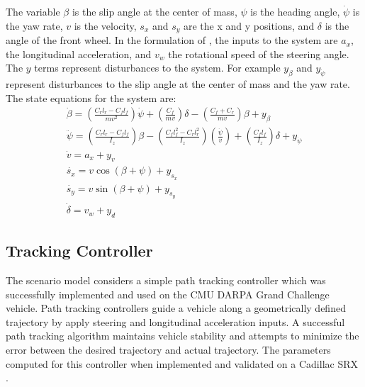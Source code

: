 The variable \(\beta\) is the slip angle at the center of mass, \(\psi\) is the heading angle, \(\dot{\psi}\) is the yaw rate, \(v\) is the velocity, \(s_x\) and \(s_y\) are the x and y positions, and \(\delta\) is the angle of the front wheel. 
In the formulation of \cite{Althoff2014}, the inputs to the system are \(a_x\), the longitudinal acceleration, and \(v_w\) the rotational speed of the steering angle. The \(y\) terms represent disturbances to the system. 
For example \(y_{\beta}\) and \(y_{\dot{\psi}}\) represent disturbances to the slip angle at the center of mass and the yaw rate. The state equations for the system are:
\begin{gather*}
\label{eqn:beta}
\dot{\beta}=\left(\frac{C_rl_r-C_fl_f}{mv^2} \right)\dot{\psi}+\left(\frac{C_f}{mv} \right)\delta-\left(\frac{C_f+C_r}{mv} \right)\beta+y_{\beta}
\\
\label{eqn:psi}
\ddot{\psi}=\left(\frac{C_rl_r-C_fl_f}{I_z} \right)\beta-\left(\frac{C_fl_f^2-C_rl_r^2}{I_z} \right)\left(\frac{\dot{\psi}}{v} \right)+\left(\frac{C_fl_f}{I_z} \right)\delta+y_{\dot{\psi}}
\\
\label{eqn:v}
\dot{v}=a_x+y_v
\\
\label{eqn:sx}
\dot{s_x}=v\cos{(\beta+\psi)}+y_{s_x}
\\
\label{eqn:sy}
\dot{s_y}=v\sin{(\beta+\psi)}+y_{s_y}
\\
\label{eqn:delta}
\dot{\delta}=v_w+y_d
\end{gather*}


\subsection{Tracking Controller}
The scenario model considers a simple path tracking controller which was successfully implemented and used on the CMU DARPA Grand Challenge vehicle. Path tracking controllers guide a vehicle along a geometrically defined trajectory by apply steering and longitudinal acceleration inputs. A successful path tracking algorithm maintains vehicle stability and attempts to minimize the error between the desired trajectory and actual trajectory. The parameters computed for this controller when implemented and validated on a Cadillac SRX \cite{Althoff2014}.

